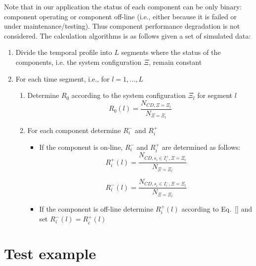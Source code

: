 Note that in our application the status of each component can be only binary: 
component operating or component off-line (i.e., either because it is failed or 
under maintenance/testing). Thus component performance degradation is not considered.
The calculation algorithms is as follows given a set of simulated data:
\begin{enumerate}
  \item Divide the temporal profile into $L$ segments where the status of the components,
        i.e. the system configuration $\Xi$, remain constant
  \item For each time segment, i.e., for $l=1,\ldots,L$ 
        \begin{enumerate}
          \item Determine $R_0$ according to the system configuration $\Xi_l$ for segment $l$
            \begin{equation}
              R_0(l) = \frac{N_{CD, \Xi=\Xi_l}}{N_{\Xi=\Xi_l}} 
              \label{eq:}
            \end{equation}
          \item For each component determine $R_i^-$ and $R_i^+$
          \begin{itemize}
            \item If the component is on-line, $R_i^-$ and $R_i^+$ are determined as follows:
              \begin{equation}
                R_i^+(l) = \frac{N_{CD, s_i \in I_i^+, \Xi=\Xi_l}}{N_{\Xi=\Xi_l}} 
                \label{eq:}
              \end{equation}
              
              \begin{equation}
                R_i^-(l) = \frac{N_{CD, s_i \in I_i^-, \Xi=\Xi_l}}{N_{\Xi=\Xi_l}} 
                \label{eq:}
              \end{equation}
            \item If the component is off-line determine $R_i^+(l)$ according to Eq.~\ref{} and 
                 set $R_i^-(l)=R_i^+(l)$
          \end{itemize}
        \end{enumerate}
\end{enumerate}

\section{Test example}
\label{sec:timeDepRIMsExample}

